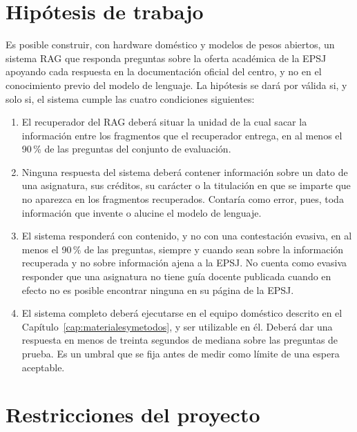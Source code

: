 \section{Hipótesis de trabajo}
\label{secc:hipotesis}


Es posible construir, con hardware doméstico y modelos de pesos abiertos, un sistema RAG que responda preguntas
sobre la oferta académica de la EPSJ apoyando cada respuesta en la documentación oficial del
centro, y no en el conocimiento previo del modelo de lenguaje.
La hipótesis se dará por válida si, y solo si, el sistema cumple las cuatro condiciones siguientes:

\begin{enumerate}                                      
  \item El recuperador del RAG deberá situar la unidad de la cual sacar la información entre
        los fragmentos que el recuperador entrega, en al menos el
          90\,\% de las preguntas del conjunto de evaluación.
        
  \item Ninguna respuesta del sistema deberá contener información sobre un dato de una
        asignatura, sus créditos, su carácter o la titulación en que se imparte que no aparezca
        en los fragmentos recuperados. Contaría como error, pues, toda información que invente o alucine el modelo de lenguaje.
        
  \item El sistema responderá con contenido, y no con una contestación evasiva, en al menos el
        90\,\% de las preguntas, siempre y cuando sean sobre la información recuperada y no
        sobre información ajena a la EPSJ. No cuenta como evasiva responder que una asignatura no tiene guía docente publicada
        cuando en efecto no es posible encontrar ninguna en su página de la EPSJ.
        
  \item El sistema completo deberá ejecutarse en el equipo doméstico descrito en el
        Capítulo~\ref{cap:materialesymetodos}, y ser utilizable en él. Deberá dar una respuesta en menos de treinta segundos
        de mediana sobre las preguntas de prueba. Es un umbral que se fija antes de medir como límite de una espera aceptable.
        
\end{enumerate}


\section{Restricciones del proyecto}

